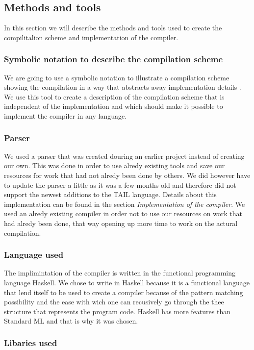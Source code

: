 \documentclass[11pt]{article}
\begin{document}
\subsection{Methods and tools}
In this section we will describe the methods and tools used to create the compilitalion scheme and implementation of the compiler. 

\subsubsection{Symbolic notation to describe the compilation scheme}
We are going to use a symbolic notation to illustrate a compilation scheme showing the compilation in a way that abstracts away implementation details \cite{MartinElsmanNotation}. We use this tool to create a description of the compilation scheme that is independent of the implementation and which should make it possible to implement the compiler in any language.

\subsubsection{Parser}
We used a parser that was created douring an earlier project \cite{APLACC} instead of creating our own. This was done in order to use alredy existing tools and save our resources for work that had not alredy been done by others. We did however have to update the parser a little as it was a few months old and therefore did not support the newest additions to the TAIL language. Details about this implementation can be found in the section \textit{Implementation of the compiler}. 
We used an alredy existing compiler in order not to use our resources on work that had alredy been done, that way opening up more time to work on the actural compilation.

\subsubsection{Language used}
The implimintation of the compiler is written in the functional programming language Haskell. We chose to write 
in Haskell because it is a functional language that lend itself to be used to create a compiler because of the 
pattern matching possibility and the ease with wich one can recusively go through the thee structure that 
represents the program code. Haskell has more features than Standard ML and that is why it was chosen. 

\subsubsection{Libaries used}
\end{document}
